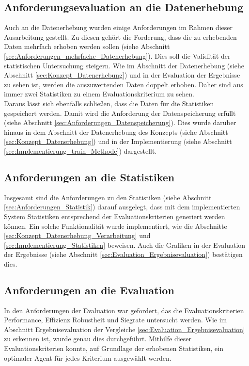 \subsection{Anforderungsevaluation an die Datenerhebung} \label{sec:Evaluation_Datenerhebung}
Auch an die Datenerhebung wurden einige Anforderungen im Rahmen dieser Ausarbeitung gestellt. Zu diesen gehört die Forderung, dass die zu erhebenden Daten mehrfach erhoben werden sollen 
(siehe Abschnitt \ref{sec:Anforderungen_mehrfache_Datenerhebung}). Dies soll die Validität der statistischen Untersuchung steigern. Wie im Abschnitt der Datenerhebung (siehe Abschnitt \ref{sec:Konzept_Datenerhebung}) und in der Evaluation der Ergebnisse zu sehen ist, werden die auszuwertenden Daten doppelt erhoben. Daher sind aus immer zwei Statistiken zu einem Evaluationskriterium zu sehen.\\
Daraus lässt sich ebenfalls schließen, dass die Daten für die Statistiken gespeichert werden. Damit wird die Anforderung der Datenspeicherung erfüllt (siehe Abschnitt \ref{sec:Anforderungen_Datenspeicherung}). Dies wurde darüber hinaus in dem Abschnitt der Datenerhebung des Konzepts (siehe Abschnitt \ref{sec:Konzept_Datenerhebung}) und in der Implementierung (siehe Abschnitt \ref{sec:Implementierung_train_Methode}) dargestellt.

\subsection{Anforderungen an die Statistiken}
Insgesamt sind die Anforderungen zu den Statistiken (siehe Abschnitt \ref{sec:Anforderungen_Statistik}) darauf ausgelegt, dass mit dem implementierten System Statistiken entsprechend der Evaluationskriterien generiert werden können. Ein solche Funktionalität wurde implementiert, wie die Abschnitte \ref{sec:Konzept_Datenerhebung_Verarbeitung} und \ref{sec:Implementierung_Statistiken} beweisen. Auch die Grafiken in der Evaluation der Ergebnisse (siehe Abschnitt \ref{sec:Evaluation_Ergebnisevaluation}) bestätigen dies.

\subsection{Anforderungen an die Evaluation}
In den Anforderungen der Evaluation war gefordert, das die Evaluationskriterien Performance, Effizienz Robustheit und Siegrate untersucht werden. Wie im Abschnitt Ergebnisevaluation der Vergleiche \ref{sec:Evaluation_Ergebnisevaluation} zu erkennen ist, wurde genau dies durchgeführt. Mithilfe dieser Evaluationskriterien konnte, auf Grundlage der erhobenen Statistiken, ein optimaler Agent für jedes Kriterium ausgewählt werden.
